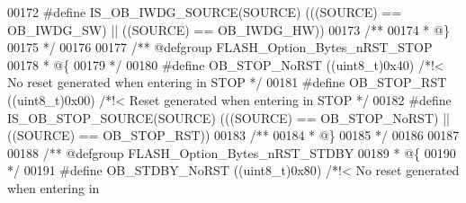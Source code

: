 \begin{DoxyCode}
00172 \textcolor{preprocessor}{#}\textcolor{preprocessor}{define} \textcolor{preprocessor}{IS\_OB\_IWDG\_SOURCE}\textcolor{preprocessor}{(}\textcolor{preprocessor}{SOURCE}\textcolor{preprocessor}{)} \textcolor{preprocessor}{(}\textcolor{preprocessor}{(}\textcolor{preprocessor}{(}\textcolor{preprocessor}{SOURCE}\textcolor{preprocessor}{)} \textcolor{preprocessor}{==} OB_IWDG_SW\textcolor{preprocessor}{)} \textcolor{preprocessor}{||} \textcolor{preprocessor}{(}\textcolor{preprocessor}{(}\textcolor{preprocessor}{SOURCE}\textcolor{preprocessor}{)} \textcolor{preprocessor}{==} 
      OB_IWDG_HW\textcolor{preprocessor}{)}\textcolor{preprocessor}{)}
00173 \textcolor{comment}{/**}
00174 \textcolor{comment}{  * @\}}
00175 \textcolor{comment}{  */}
00176 
00177 \textcolor{comment}{/** @defgroup FLASH\_Option\_Bytes\_nRST\_STOP }
00178 \textcolor{comment}{  * @\{}
00179 \textcolor{comment}{  */}
00180 \textcolor{preprocessor}{#}\textcolor{preprocessor}{define} \textcolor{preprocessor}{OB\_STOP\_NoRST}                  \textcolor{preprocessor}{(}\textcolor{preprocessor}{(}\textcolor{preprocessor}{uint8\_t}\textcolor{preprocessor}{)}0x40\textcolor{preprocessor}{)} \textcolor{comment}{/*!< No reset generated when entering in STOP
       */}
00181 \textcolor{preprocessor}{#}\textcolor{preprocessor}{define} \textcolor{preprocessor}{OB\_STOP\_RST}                    \textcolor{preprocessor}{(}\textcolor{preprocessor}{(}\textcolor{preprocessor}{uint8\_t}\textcolor{preprocessor}{)}0x00\textcolor{preprocessor}{)} \textcolor{comment}{/*!< Reset generated when entering in STOP */}
00182 \textcolor{preprocessor}{#}\textcolor{preprocessor}{define} \textcolor{preprocessor}{IS\_OB\_STOP\_SOURCE}\textcolor{preprocessor}{(}\textcolor{preprocessor}{SOURCE}\textcolor{preprocessor}{)} \textcolor{preprocessor}{(}\textcolor{preprocessor}{(}\textcolor{preprocessor}{(}\textcolor{preprocessor}{SOURCE}\textcolor{preprocessor}{)} \textcolor{preprocessor}{==} OB_STOP_NoRST\textcolor{preprocessor}{)} \textcolor{preprocessor}{||} \textcolor{preprocessor}{(}\textcolor{preprocessor}{(}\textcolor{preprocessor}{SOURCE}\textcolor{preprocessor}{)} \textcolor{preprocessor}{==} 
      OB_STOP_RST\textcolor{preprocessor}{)}\textcolor{preprocessor}{)}
00183 \textcolor{comment}{/**}
00184 \textcolor{comment}{  * @\}}
00185 \textcolor{comment}{  */}
00186 
00187 
00188 \textcolor{comment}{/** @defgroup FLASH\_Option\_Bytes\_nRST\_STDBY }
00189 \textcolor{comment}{  * @\{}
00190 \textcolor{comment}{  */}
00191 \textcolor{preprocessor}{#}\textcolor{preprocessor}{define} \textcolor{preprocessor}{OB\_STDBY\_NoRST}                 \textcolor{preprocessor}{(}\textcolor{preprocessor}{(}\textcolor{preprocessor}{uint8\_t}\textcolor{preprocessor}{)}0x80\textcolor{preprocessor}{)} \textcolor{comment}{/*!< No reset generated when entering in
}
\end{DoxyCode}
